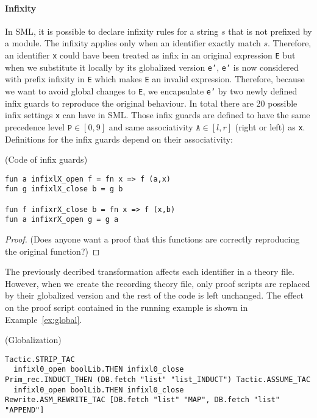 \documentclass[runningheads,a4paper,draft]{svjour3}
\def\sml{\textsf{SML}\xspace}
\begin{document}
\paragraph{Infixity}
In \sml, it is possible to declare infixity rules for a string $s$ that 
is not prefixed by a module. The infixity applies only when an identifier 
exactly match $s$. Therefore, an identifier \texttt{x} could have been treated 
as infix in an original expression \texttt{E} but when 
we substitute it locally by its 
globalized version \texttt{e'}, \texttt{e'} is now considered with prefix 
infixity in \texttt{E} which makes \texttt{E} an invalid expression. Therefore, 
because we 
want to avoid global changes to \texttt{E}, we encapsulate \texttt{e'} by two 
newly 
defined 
infix guards to reproduce 
the original behaviour.
In total there are 20 possible infix settings \texttt{x} can have in \sml.
Those infix guards are defined to have the 
same 
precedence level $\texttt{P}\in[0,9]$ and same associativity 
$\texttt{A}\in[l,r]$ (right or left) as \texttt{x}.
Definitions for the infix guards depend on their associativity: 

\begin{definition}(Code of infix guards)
\begin{lstlisting}
fun a infixlX_open f = fn x => f (a,x)  
fun g infixlX_close b = g b

fun f infixrX_close b = fn x => f (x,b)
fun a infixrX_open g = g a
\end{lstlisting}
\end{definition}

\begin{proof}(Does anyone want a proof that this functions are correctly 
reproducing the original function?)
\end{proof}

The previously decribed transformation affects each identifier in a theory 
file. However, when we 
create the recording theory file, only proof scripts are replaced by their 
globalized version and the rest of the code is left unchanged. The effect on 
the proof script contained in the running example is shown in 
Example~\ref{ex:global}.



\begin{example} (Globalization)
\begin{lstlisting}
Tactic.STRIP_TAC 
  infixl0_open boolLib.THEN infixl0_close
Prim_rec.INDUCT_THEN (DB.fetch "list" "list_INDUCT") Tactic.ASSUME_TAC
  infixl0_open boolLib.THEN infixl0_close
Rewrite.ASM_REWRITE_TAC [DB.fetch "list" "MAP", DB.fetch "list" "APPEND"]
\end{lstlisting}
\end{example} 
\end{document}
